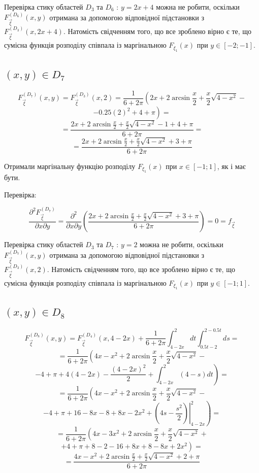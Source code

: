 \documentclass[14pt, a4paper, ukrainian]{extreport}
\begin{document}
	Перевірка стику областей $D_3$ та $D_6$ : $ y = 2x + 4$ можна не робити, оскільки $F_{\vec \xi}^{\left(D_6\right)}(x, y)$ отримана за допомогою відповідної підстановки з \\
	$F_{\vec \xi}^{\left(D_3\right)}(x, 2x + 4)$. Натомість свідченням того, що все зроблено вірно є те, що сумісна функція розподілу співпала із маргінальною $ F_{\xi_1} (x) $ при $y \in [-2; -1]$.
	
	\subsection{$(x, y) \in D_7$}
	
	$$ F_{\vec \xi}^{\left(D_7\right)}(x, y) = F_{\vec \xi}^{\left(D_3\right)}(x, 2) = \frac{1}{6+2\pi}\left(2x + 2\arcsin\frac{x}{2} + \frac{x}{2}\sqrt{4-x^2} - \right.
	$$
	$$ \left.- 0.25(2)^2 + 4 + \pi \right) = 
	$$
	$$ = \frac{2x + 2\arcsin\frac{x}{2} + \frac{x}{2}\sqrt{4-x^2} - 1 + 4 + \pi}{6+2\pi} = 
	$$
	$$ = \frac{2x + 2\arcsin\frac{x}{2} + \frac{x}{2}\sqrt{4-x^2} + 3 + \pi}{6+2\pi} 
	$$
	
	Отримали маргінальну функцію розподілу $ F_{\xi_1} (x) $ при $x \in [-1; 1]$, як і має бути.
	
	Перевірка:
	
	$$\frac{\partial^2F_{\vec\xi}^{\left(D_7\right)}}{\partial x \partial y} = \frac{\partial^2}{\partial x \partial y} \left(\frac{2x + 2\arcsin\frac{x}{2} + \frac{x}{2}\sqrt{4-x^2} + 3 + \pi}{6+2\pi} \right) = 0 = f_{\vec\xi}
	$$
	
	Перевірка стику областей $D_3$ та $D_7$ : $ y = 2$ можна не робити, оскільки $F_{\vec \xi}^{\left(D_7\right)}(x, y)$ отримана за допомогою відповідної підстановки з \\
	$F_{\vec \xi}^{\left(D_3\right)}(x, 2)$. Натомість свідченням того, що все зроблено вірно є те, що сумісна функція розподілу співпала із маргінальною $ F_{\xi_1} (x) $ при $y \in [-1; 1]$.
		
	
	\subsection{$(x, y) \in D_8$}
	
	$$ F_{\vec \xi}^{\left(D_8\right)}(x, y) = F_{\vec \xi}^{\left(D_4\right)}(x, 4 - 2x) +  \frac{1}{6+2\pi}\int_{4 - 2x}^{2}dt\int_{0.5t - 2}^{2 - 0.5 t}ds = 
	$$
	$$ = \frac{1}{6+2\pi}\left(4x -x^2 + 2\arcsin\frac{x}{2} + \frac{x}{2}\sqrt{4-x^2} -  \right.
	$$
	$$ - \left.4 + \pi + 4(4 - 2x) - \frac{(4-2x)^2}{2} + \int_{4 - 2x}^{2}(4 - s)dt\right) = 
	$$
	$$ = \frac{1}{6+2\pi}\left(4x -x^2 + 2\arcsin\frac{x}{2} + \frac{x}{2}\sqrt{4-x^2} -  \right.
	$$
	$$ - \left.4 + \pi + 16 - 8x - 8 +8x -2x^2 + \left.\left(4s - \frac{s^2}{2}\right)\right|_{4-2x}^{2}\right) =
	$$
	$$ = \frac{1}{6+2\pi}\left(4x -3x^2 + 2\arcsin\frac{x}{2} + \frac{x}{2}\sqrt{4-x^2} + \right.
	$$
	$$ + \left.4 + \pi +8 - 2 - 16 + 8x + 8 - 8x +2x^2 \right) =
	$$
	$$ = \frac{4x - x^2 + 2\arcsin\frac{x}{2} + \frac{x}{2}\sqrt{4-x^2} + 2 + \pi}{6+2\pi}
	$$
	
\end{document}
